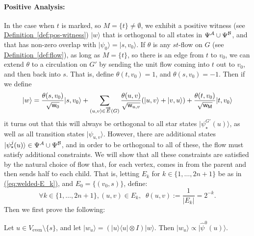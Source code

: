 \documentclass{article}
\newcommand{\eq}[1]{\hyperref[eq:#1]{(\ref*{eq:#1})}}
\newcommand{\defin}[1]{\hyperref[def:#1]{Definition~\ref*{def:#1}}}
\def\ket#1{{\lvert}#1\rangle}
\def\bra#1{{\langle}#1\rvert}
\renewcommand{\>}{\rangle}
\newcommand{\<}{\langle}
\renewcommand{\(}{\left(}
\renewcommand{\)}{\right)}
\def\w{{\sf w}}
\begin{document}
\paragraph{Positive Analysis:} In the case when $t$ is marked, so $M=\{t\}\neq\emptyset$, we exhibit a positive witness (see \defin{pos-witness}) $\ket{w}$ that is orthogonal to all states in $\Psi^{\cal A}\cup \Psi^{\cal B}$, and that has non-zero overlap with $\ket{\psi_0}=\ket{s,v_0}$. If $\theta$ is any $st$-flow on $G$ (see \defin{flow}), as long as $M=\{t\}$, so there is an edge from $t$ to $v_0$, we can extend $\theta$ to a circulation on $G'$ by sending the unit flow coming into $t$ out to $v_0$, and then back into $s$. That is, define $\theta(t,v_0)=1$, and $\theta(s,v_0)=-1$. Then if we define 
\begin{equation}
\ket{w}=\frac{\theta(s,v_0)}{\sqrt{\w_0}}\ket{s,v_0}+\sum_{(u,v)\in\overrightarrow{E}(G)}\frac{\theta(u,v)}{\sqrt{\w_{u,v}}}(\ket{u,v}+\ket{v,u})+\frac{\theta(t,v_0)}{\sqrt{\w_{\sf M}}}\ket{t,v_0}
\label{eq:welded-pos-witness}
\end{equation}
it turns out that this will always be orthogonal to all star states $\ket{\psi_\star^{G'}(u)}$, as well as all transition states $\ket{\psi_{u,v}}$. However, there are additional states $\ket{\psi^j_\star(u)}\in\Psi^{\cal A}\cup \Psi^{\cal B}$, and in order to be orthogonal to all of these, the flow must satisfy additional constraints. We will show that all these constraints are satisfied by the natural choice of flow that, for each vertex, comes in from the parent and then sends half to each child. That is, letting $E_k$ for $k\in \{1,\dots,2n+1\}$ be as in \eq{welded-E_k}, and $E_0=\{(v_0,s)\}$, define:
\begin{equation}
\forall k\in \{1,\dots,2n+1\}, (u,v)\in E_k,\;\; \theta(u,v) := \frac{1}{|E_k|}=2^{-k}. \label{eq:welded-flow}
\end{equation}
Then we first prove the following:
\begin{claim}\label{clm:welded-pos}
Let $u\in V_{\mathrm{even}}\setminus\{s\}$, and let $\ket{w_u} = (\ket{u}\bra{u}\otimes I)\ket{w}.$
Then $\ket{w_u}\propto \ket{\widehat{\psi}^0(u)}$.
\end{claim}
\end{document}
